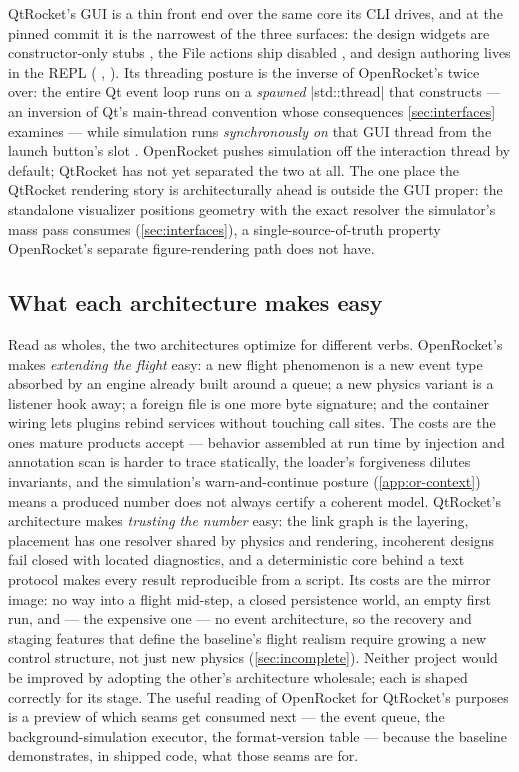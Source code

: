 QtRocket's GUI is a thin front end over the same core its CLI drives, and at the pinned
commit it is the narrowest of the three surfaces: the design widgets are constructor-only
stubs , the File actions ship disabled
, and design authoring lives in the REPL
( ,  ).
Its threading posture is the inverse of OpenRocket's twice over: the entire Qt event loop
runs on a \emph{spawned} \cppinline|std::thread| that constructs 
 --- an inversion of Qt's main-thread convention whose
consequences \cref{sec:interfaces} examines --- while simulation runs \emph{synchronously
on} that GUI thread from the launch button's slot .
OpenRocket pushes simulation off the interaction thread by default; QtRocket has not yet
separated the two at all. The one place the QtRocket rendering story is architecturally
ahead is outside the GUI proper: the standalone visualizer positions geometry with the
exact resolver the simulator's mass pass consumes (\cref{sec:interfaces}), a
single-source-of-truth property OpenRocket's separate figure-rendering path does not have.

\subsection{What each architecture makes easy}\label{app:or-architecture-close}

Read as wholes, the two architectures optimize for different verbs. OpenRocket's makes
\emph{extending the flight} easy: a new flight phenomenon is a new event type absorbed by
an engine already built around a queue; a new physics variant is a listener hook away; a
foreign file is one more byte signature; and the container wiring lets plugins rebind
services without touching call sites. The costs are the ones mature products accept ---
behavior assembled at run time by injection and annotation scan is harder to trace
statically, the loader's forgiveness dilutes invariants, and the simulation's
warn-and-continue posture (\cref{app:or-context}) means a produced number does not always
certify a coherent model. QtRocket's architecture makes \emph{trusting the number} easy:
the link graph is the layering, placement has one resolver shared by physics and rendering,
incoherent designs fail closed with located diagnostics, and a deterministic core behind a
text protocol makes every result reproducible from a script. Its costs are the mirror
image: no way into a flight mid-step, a closed persistence world, an empty first run, and
--- the expensive one --- no event architecture, so the recovery and staging features that
define the baseline's flight realism require growing a new control structure, not just new
physics (\cref{sec:incomplete}). Neither project would be improved by adopting the other's
architecture wholesale; each is shaped correctly for its stage. The useful reading of
OpenRocket for QtRocket's purposes is a preview of which seams get consumed next --- the
event queue, the background-simulation executor, the format-version table --- because the
baseline demonstrates, in shipped code, what those seams are for.
